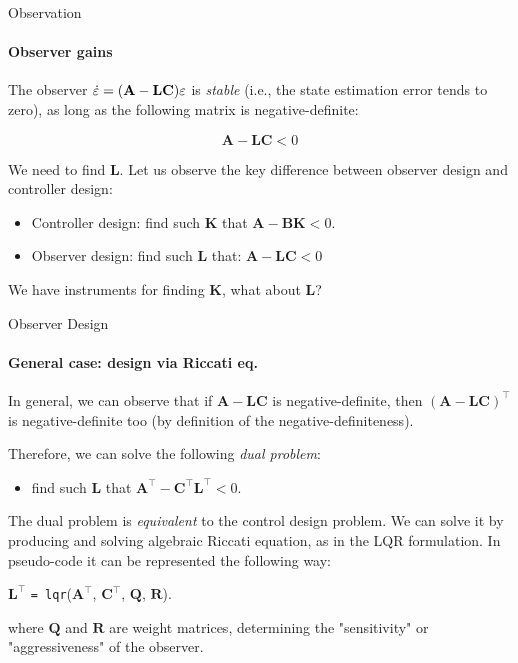 \documentclass{beamer}
\begin{document}
\begin{frame}{Observation}
\framesubtitle{Observer gains}
\begin{flushleft}

The observer $\dot {\varepsilon}= 
(\mathbf A - \mathbf L \mathbf{C}) \varepsilon$ is \emph{stable} (i.e., the state estimation error tends to zero), as long as the following matrix is negative-definite:

\[
\mathbf A - 
\mathbf L \mathbf C < 0
\]

We need to find $\mathbf L$. Let us observe the key difference between observer design and controller design:

\bigskip

\begin{itemize}
    \item Controller design: find such $\mathbf K$ that $\mathbf A - \mathbf B \mathbf K < 0$.
    \item Observer design: find such $\mathbf L$ that: $\mathbf A - \mathbf L \mathbf C < 0$
\end{itemize}

\bigskip

We have instruments for finding $\mathbf K$, what about $\mathbf L$?

\end{flushleft}
\end{frame}


\begin{frame}{Observer Design}
\framesubtitle{General case: design via Riccati eq.}
\begin{flushleft}

In general, we can observe that if $\mathbf A - \mathbf L \mathbf C$ is negative-definite, then $(\mathbf A - 
\mathbf L \mathbf C)^{\top}$ is negative-definite too (by definition of the negative-definiteness). 

\bigskip

Therefore, we can solve the following \emph{dual problem}:

\begin{itemize}
    \item find such $\mathbf L$ that $\mathbf A^{\top} - 
\mathbf C^{\top} \mathbf L^{\top} < 0$.
\end{itemize}

\bigskip

The dual problem is \emph{equivalent} to the control design problem. We can solve it by producing and solving algebraic Riccati equation, as in the LQR formulation. In pseudo-code it can be represented the following way:

\bigskip

$\mathbf L^{\top}$ \texttt{= lqr}($\mathbf A^{\top}$, $\mathbf C^{\top}$, $\mathbf Q$, $\mathbf R$).

where $\mathbf Q$ and $\mathbf R$ are weight  matrices, determining the "sensitivity" or "aggressiveness" of the observer.


\end{flushleft}
\end{frame}
\end{document}
